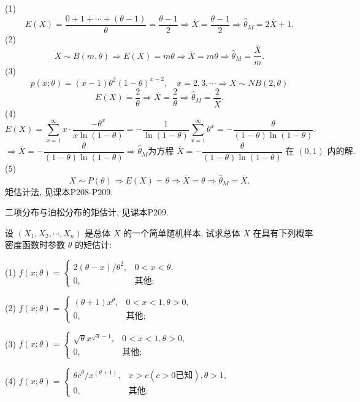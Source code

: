 \documentclass[standard]{ExBook}
\renewenvironment{shaded}{%
  \def\FrameCommand{\fboxsep=\FrameSep \colorbox{shadecolor}}%
  \MakeFramed{\advance\hsize-\width \FrameRestore}%
}{%
  \endMakeFramed
}
\begin{document}
\begin{qitems}
(1)
$$
E(X)=\frac{0+1+\cdots+(\theta-1)}{\theta}=\frac{\theta-1}{2}
\Longrightarrow 
\overline{X}=\frac{\theta-1}{2}
\Longrightarrow 
\hat{\theta}_{M}=2\overline{X}+1.
$$
(2)
$$
X\sim B(m,\theta)
\Longrightarrow 
E(X)=m\theta
\Longrightarrow 
\overline{X}=m\theta
\Longrightarrow 
\hat{\theta}_{M}=\frac{\overline{X}}{m}.
$$
(3)
$$
p(x;\theta)=(x-1)\theta^2(1-\theta)^{x-2},\quad x=2,3,\cdots
\Longrightarrow 
X\sim NB(2,\theta)
$$
$$
E(X)=\frac{2}{\theta}
\Longrightarrow 
\overline{X}=\frac{2}{\theta}
\Longrightarrow 
\hat{\theta}_{M}=\frac{2}{\overline{X}}.
$$
(4)
$$
E(X)=\sum\limits_{x=1}^{\infty}x\cdot\frac{-\theta^x}{x\ln(1-\theta)}
=
-\frac{1}{\ln(1-\theta)}\sum\limits_{x=1}^{\infty}\theta^x
=
-\frac{\theta}{(1-\theta)\ln(1-\theta)}.
$$
$$
\Longrightarrow
\overline{X}=-\frac{\theta}{(1-\theta)\ln(1-\theta)}
\Longrightarrow 
\hat{\theta}_{M}\text{为方程 }
\overline{X}=-\frac{\theta}{(1-\theta)\ln(1-\theta)}
\text{ 在 }(0,1)\text{ 内的解}.
$$
(5)
$$
X\sim P(\theta)
\Longrightarrow 
E(X)=\theta
\Longrightarrow 
\overline{X}=\theta
\Longrightarrow 
\hat{\theta}_{M}=\overline{X}.
$$
\textcolor{themeColor}{\selectfont {} 矩估计法, 见课本P208-P209.}

\textcolor{themeColor}{\selectfont {} 二项分布与泊松分布的矩估计, 见课本P209.}

\vspace{2.5cm-5em}

    \begin{bbox}
    \begin{shaded}
        \qitem
设 \((X_1, X_2, \cdots, X_n)\) 是总体 \(X\) 的一个简单随机样本, 试求总体 \(X\) 在具有下列概率密度函数时参数 \(\theta\) 的矩估计:

(1) \(f(x; \theta) = 
\begin{cases} 
2(\theta - x)/\theta^2, & 0 < x < \theta, \\
0, & \text{其他};
\end{cases}\)

(2) \(f(x; \theta) = 
\begin{cases} 
(\theta + 1)x^{\theta}, & 0 < x < 1, \theta > 0, \\
0, & \text{其他};
\end{cases}\)

(3) \(f(x; \theta) = 
\begin{cases} 
\sqrt{\theta}x^{\sqrt{\theta}-1}, & 0 < x < 1, \theta > 0, \\
0, & \text{其他};
\end{cases}\)

(4) \(f(x; \theta) = 
\begin{cases} 
\theta c^{\theta}/x^{(\theta+1)}, & x > c (c > 0 \text{已知}), \theta > 1, \\
0, & \text{其他};
\end{cases}\)


\end{shaded}
\end{bbox}
\end{qitems}
\end{document}
